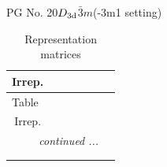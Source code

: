 \documentclass[fleqn,8pt,landscape]{jsarticle}
\begin{document}
\setcounter{MaxMatrixCols}{32}

\renewcommand{\tablename}{Table~}
\renewcommand{\figurename}{Figure~}
\begin{center}
\LARGE
PG No. 20\quad$D_{\rm 3d}$\quad$\bar{3}m$\quad(-3m1 setting)\quad[ trigonal ]
\end{center}
\renewcommand{\arraystretch}{1.2}
\begin{longtable}{ccccccc}
\caption{Representation matrices}
 \\
 \hline \hline
Irrep. &  &  &  &  &  &  \\ \hline \endfirsthead

\multicolumn{6}{l}{\tablename\ \thetable{}} \\
 \hline \hline
Irrep. &  &  &  &  &  &  \\ \hline \endhead

 \hline \hline
\multicolumn{6}{r}{\footnotesize\it continued ...} \\ \endfoot

 \hline \hline
\multicolumn{6}{r}{} \\ \endlastfoot


\end{longtable}
\end{document}
